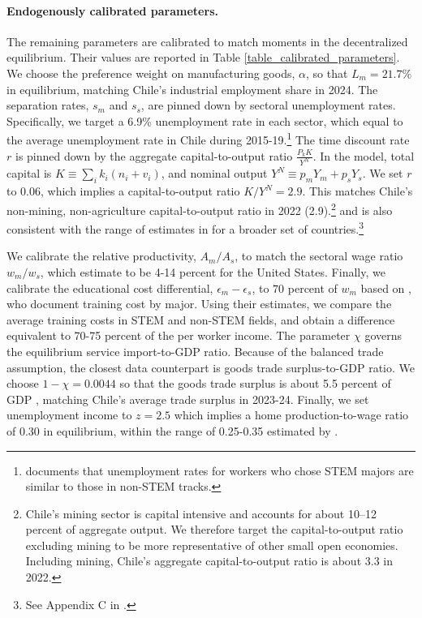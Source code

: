 \documentclass[12pt]{article} %
\theoremstyle{definition}
\begin{document}
\paragraph{Endogenously calibrated parameters. } The remaining parameters are calibrated to match moments in the decentralized equilibrium.  Their values are reported in Table \ref{table_calibrated_parameters}. We choose the  preference weight on manufacturing goods, $\alpha$,  so that $L_m=21.7\%$ in equilibrium, matching Chile's industrial employment share in 2024. The separation rates, $s_m$ and $s_s$, are pinned down by  sectoral unemployment rates.  Specifically, we target a 6.9\% unemployment rate  in each sector, which equal to the average unemployment rate in Chile during 2015-19.\footnote{\cite{CNEP2024STEM} documents that unemployment rates for workers who chose STEM majors are similar to those in non-STEM tracks. } %
The time discount rate $r$ is pinned down by the aggregate capital-to-output ratio $\frac{P_kK}{Y^N}$. In the model, total capital is  $K\equiv \sum_i k_i(n_i+v_i)$, and nominal output $Y^N\equiv p_mY_m+p_sY_s$.    We set $r$ to 0.06, which implies a capital-to-output ratio $K/Y^N = 2.9$. This matches Chile's  non-mining, non-agriculture capital-to-output ratio in 2022 (2.9).\footnote{Chile’s mining sector is capital intensive and accounts for about 10–12 percent of aggregate output. We therefore target the capital-to-output ratio excluding mining to be more representative of other small open economies. Including mining, Chile’s aggregate capital-to-output ratio is about 3.3 in 2022.} and is  also consistent with the range of estimates in \cite{feenstra2015next} for a broader set of countries.\footnote{See Appendix C in \cite{feenstra2015next}.}

We calibrate the relative productivity, $A_m/A_s$, to match the sectoral wage ratio $w_m/w_s$, which \cite{elvery2021manufacturing} estimate to be 4-14 percent for the United States.  Finally, we calibrate the educational cost differential, $\epsilon_m-\epsilon_s$, to $70$ percent of $w_m$ based on \cite{altonji2018costs}, who  document training cost by major. Using their estimates, we compare the average training costs in STEM and non-STEM fields, %
and obtain a difference  equivalent to 70-75 percent of the per worker income.  The parameter $\chi$ governs the equilibrium service import-to-GDP ratio. Because of the balanced trade assumption, the closest data counterpart is goods trade surplus-to-GDP ratio. 
We choose $1-\chi=0.0044$ so that the goods trade surplus is about 5.5 percent of GDP , matching Chile's average trade surplus in 2023-24.  Finally, we set unemployment income to $z=2.5$ which implies a  home production-to-wage ratio of 0.30 in equilibrium, within the range  of 0.25-0.35 estimated by \cite{house2008valuing}.
\end{document}
